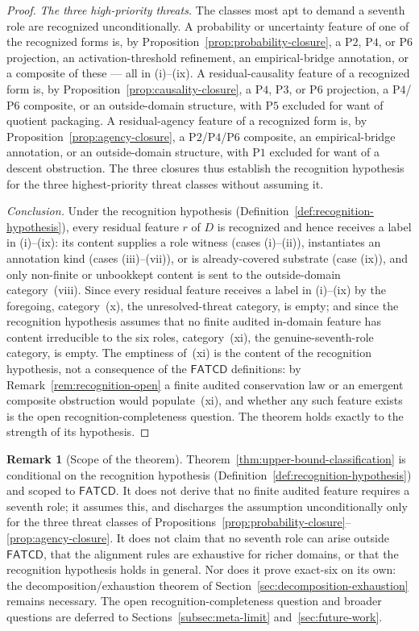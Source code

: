 \documentclass[11pt]{article}
\theoremstyle{definition}
\newtheorem{remark}[theorem]{Remark}
\newcommand{\FATCD}{\ensuremath{\mathsf{FATCD}}}
\newcommand{\Pone}{\ensuremath{\mathrm{P1}}}
\newcommand{\Ptwo}{\ensuremath{\mathrm{P2}}}
\newcommand{\Pthree}{\ensuremath{\mathrm{P3}}}
\newcommand{\Pfour}{\ensuremath{\mathrm{P4}}}
\newcommand{\Pfive}{\ensuremath{\mathrm{P5}}}
\newcommand{\Psix}{\ensuremath{\mathrm{P6}}}
\begin{document}
\begin{proof}
\emph{The three high-priority threats.} The classes most apt to demand a
seventh role are recognized unconditionally. A probability or uncertainty
feature of one of the recognized forms is, by
Proposition~\ref{prop:probability-closure}, a \Ptwo{}, \Pfour{}, or \Psix{}
projection, an activation-threshold refinement, an empirical-bridge annotation,
or a composite of these --- all in (i)--(ix). A residual-causality feature of a
recognized form is, by Proposition~\ref{prop:causality-closure}, a \Pfour{},
\Pthree{}, or \Psix{} projection, a \Pfour{}/\Psix{} composite, or an
outside-domain structure, with \Pfive{} excluded for want of quotient packaging.
A residual-agency feature of a recognized form is, by
Proposition~\ref{prop:agency-closure}, a \Ptwo{}/\Pfour{}/\Psix{} composite, an
empirical-bridge annotation, or an outside-domain structure, with \Pone{}
excluded for want of a descent obstruction. The three closures thus establish the
recognition hypothesis for the three highest-priority threat classes without
assuming it.

\emph{Conclusion.} Under the recognition hypothesis
(Definition~\ref{def:recognition-hypothesis}), every residual feature \(r\) of
\(D\) is recognized and hence receives a label in (i)--(ix): its content supplies
a role witness (cases (i)--(ii)), instantiates an annotation kind (cases
(iii)--(vii)), or is already-covered substrate (case (ix)), and only non-finite
or unbookkept content is sent to the outside-domain category~(viii). Since every residual feature receives a label in (i)--(ix) by the foregoing,
category~(x), the unresolved-threat category, is empty; and since the recognition hypothesis
assumes that no finite audited in-domain feature has content irreducible to the
six roles, category~(xi), the genuine-seventh-role category, is empty. The
emptiness of~(xi) is the content of the recognition hypothesis, not a consequence
of the \FATCD{} definitions: by Remark~\ref{rem:recognition-open} a finite
audited conservation law or an emergent composite obstruction would
populate~(xi), and whether any such feature exists is the open
recognition-completeness question. The theorem holds exactly to the strength of
its hypothesis.
\end{proof}

\begin{remark}[Scope of the theorem]\label{rem:classification-scope}
Theorem~\ref{thm:upper-bound-classification} is conditional on the recognition
hypothesis (Definition~\ref{def:recognition-hypothesis}) and scoped to \FATCD{}.
It does not derive that no finite audited feature requires a seventh role; it
assumes this, and discharges the assumption unconditionally only for the three
threat classes of
Propositions~\ref{prop:probability-closure}--\ref{prop:agency-closure}. It does
not claim that no seventh role can arise outside \FATCD{}, that the alignment
rules are exhaustive for richer domains, or that the recognition hypothesis holds
in general. Nor does it prove exact-six on its own: the decomposition/exhaustion
theorem of Section~\ref{sec:decomposition-exhaustion} remains necessary. The open
recognition-completeness question and broader questions are deferred to
Sections~\ref{subsec:meta-limit} and~\ref{sec:future-work}.
\end{remark}
\end{document}
